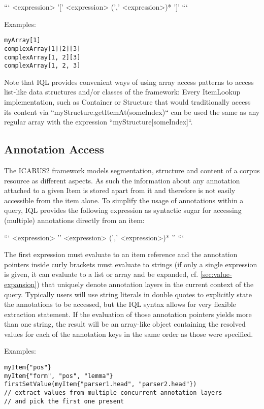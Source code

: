 \documentclass[11pt]{article}
\begin{document}
```
<expression> '[' <expression> (',' <expression>)* ']'
```

Examples:

\begin{verbatim}
myArray[1]
complexArray[1][2][3]
complexArray[1, 2][3]
complexArray[1, 2, 3]
\end{verbatim}

Note that IQL provides convenient ways of using array access patterns to access list-like data structures and/or classes of the framework:
Every ItemLookup implementation, such as Container or Structure that would traditionally access its content via ``myStructure.getItemAt(someIndex)`` can be used the same as any regular array with the expression ``myStructure[someIndex]``.

\subsection{Annotation Access}
\label{sec:annotation-access}

The ICARUS2 framework models segmentation, structure and content of a corpus resource as different aspects. As such the information about any annotation attached to a given Item is stored apart from it and therefore is not easily accessible from the item alone. To simplify the usage of annotations within a query, IQL provides the following expression as syntactic sugar for accessing (multiple) annotations directly from an item:

```
<expression> '{' <expression> (',' <expression>)* '}'
```

The first expression must evaluate to an item reference and the annotation pointers inside curly brackets must evaluate to strings (if only a single expression is given, it can evaluate to a list or array and be expanded, cf. \cref{sec:value-expansion}) that uniquely denote annotation layers in the current context of the query. Typically users will use string literals in double quotes to explicitly state the annotations to be accessed, but the IQL syntax allows for very flexible extraction statement. If the evaluation of those annotation pointers yields more than one string, the result will be an array-like object containing the resolved values for each of the annotation keys in the same order as those were specified.

Examples:

\begin{verbatim}
myItem{"pos"}
myItem{"form", "pos", "lemma"}
firstSetValue(myItem{"parser1.head", "parser2.head"})   
// extract values from multiple concurrent annotation layers
// and pick the first one present
\end{verbatim}
\end{document}
